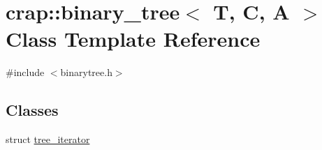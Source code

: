 \hypertarget{classcrap_1_1binary__tree}{\section{crap\-:\-:binary\-\_\-tree$<$ T, C, A $>$ Class Template Reference}
\label{classcrap_1_1binary__tree}
}


{\ttfamily \#include $<$binarytree.\-h$>$}

\subsection*{Classes}
\begin{DoxyCompactItemize}
\item 
struct \hyperlink{structcrap_1_1binary__tree_1_1tree__iterator}{tree\-\_\-iterator}
\end{DoxyCompactItemize}
